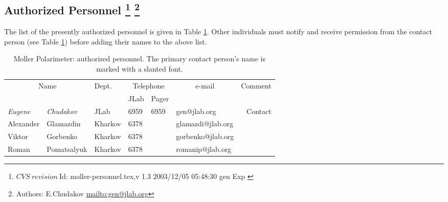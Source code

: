 \begin{safetyen}{0}{0}
\section[Authorized  Personnel]{Authorized  Personnel
\footnote{
   $CVS~revision~ $Id: moller-personnel.tex,v 1.3 2003/12/05 05:48:30 gen Exp $ $
 }
\footnote{Authors: E.Chudakov \url{mailto:gen@jlab.org}}
}
\end{safetyen}
The list
of the presently authorized personnel is given in Table \ref{tab:moller:personnel}.
Other individuals must notify and receive permission from
the contact person (see Table \ref{tab:moller:personnel}) before adding their names 
to the above list.
\begin{table}[ht]
\begin{center}
\begin{tabular}{|ll|l|l|l|l|r|} \hline
  \multicolumn{2}{|c|}{Name} & Dept. & \multicolumn{2}{c|}{Telephone} & 
  \multicolumn{1}{c|}{e-mail} & Comment \\ 
  \cline{4-5}
   &  &   & JLab & Pager &  & \\ 
\hline
 {\em Eugene} & {\em Chudakov}  & JLab    & 6959 & 6959 & gen@jlab.org      & Contact     \\ 
 Alexander    & Glamazdin       & Kharkov & 6378 &      & glamazdi@jlab.org &  \\ 
 Viktor       & Gorbenko        & Kharkov & 6378 &      & gorbenko@jlab.org &  \\ 
 Roman        & Pomatsalyuk     & Kharkov & 6378 &      & romanip@jlab.org  &  \\ 
\hline
\end{tabular}
\end{center}
\caption[Moller Polarimeter: authorized personnel]{
   Moller Polarimeter: authorized personnel. The primary contact person's
   name is marked with a slanted font. 
}
\label{tab:moller:personnel}
\end{table}

%
%
%
%
